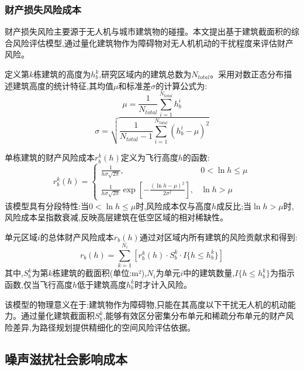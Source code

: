 \subsubsection{财产损失风险成本}

财产损失风险主要源于无人机与城市建筑物的碰撞。本文提出基于建筑截面积的综合风险评估模型,通过量化建筑物作为障碍物对无人机机动的干扰程度来评估财产风险。

定义第$k$栋建筑的高度为$h_b^k$,研究区域内的建筑总数为$N_{total}$。采用对数正态分布描述建筑高度的统计特征,其均值$\mu$和标准差$\sigma$的计算公式为:
\begin{equation}
\mu = \frac{1}{N_{total}} \sum_{i=1}^{N_{total}} h_b^i
\label{eq:building_height_mean}
\end{equation}
\begin{equation}
\sigma = \sqrt{\frac{1}{N_{total} - 1} \sum_{i=1}^{N_{total}} (h_b^i - \mu)^2}
\label{eq:building_height_std}
\end{equation}

单栋建筑的财产风险成本$r_b^k(h)$定义为飞行高度$h$的函数:
\begin{equation}
r_b^k(h) = 
\begin{cases}
\frac{1}{h\sigma\sqrt{2\pi}}, & 0 < \ln h \leq \mu \\
\frac{1}{h\sigma\sqrt{2\pi}} \exp\left[-\frac{(\ln h - \mu)^2}{2\sigma^2}\right], & \ln h > \mu
\end{cases}
\label{eq:single_building_risk}
\end{equation}
该模型具有分段特性:当$0 < \ln h \leq \mu$时,风险成本仅与高度$h$成反比;当$\ln h > \mu$时,风险成本呈指数衰减,反映高层建筑在低空区域的相对稀缺性。

单元区域$i$的总体财产风险成本$r_b(h)$通过对区域内所有建筑的风险贡献求和得到:
\begin{equation}
r_b(h) = \sum_{k=1}^{N_i} \left[r_b^k(h) \cdot S_b^k \cdot I\{h \leq h_b^k\}\right]
\label{eq:unit_property_risk}
\end{equation}
其中,$S_b^k$为第$k$栋建筑的截面积(单位:m²),$N_i$为单元$i$中的建筑数量,$I\{h \leq h_b^k\}$为指示函数,仅当飞行高度$h$低于建筑高度$h_b^k$时才计入风险。

该模型的物理意义在于:建筑物作为障碍物,只能在其高度以下干扰无人机的机动能力。通过量化建筑截面积$S_b^k$,能够有效区分密集分布单元和稀疏分布单元的财产风险差异,为路径规划提供精细化的空间风险评估依据。

\subsection{噪声滋扰社会影响成本}

